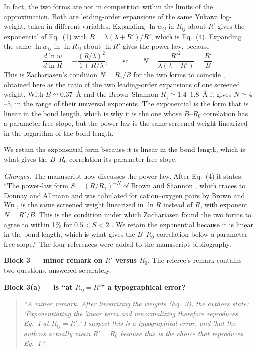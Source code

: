 \documentclass[11pt]{article}
\newenvironment{refquote}%
  {\begin{quote}\itshape\color{black!70}}%
  {\end{quote}}
\begin{document}
In fact, the two forms are not in competition within the limits of the approximation.  
Both are leading-order expansions of the same
Yukawa log-weight, taken in different variables.  Expanding
$\ln w_{ij}$ in $R_{ij}$ about $R'$ gives the exponential of
Eq.~(1) with $B=\lambda(\lambda+R')/R'$, which is Eq.~(4).
Expanding the same $\ln w_{ij}$ in $\ln R_{ij}$ about $\ln R'$ gives
the power law, because
\[
\frac{d\ln w}{d\ln R}
=-\frac{(R/\lambda)^2}{1+R/\lambda},
\qquad\text{so}\qquad
N=\frac{R'^2}{\lambda(\lambda+R')}=\frac{R'}{B}.
\]
This is Zachariasen's condition $N=R_1/B$ for the two forms to
coincide \cite{Zachariasen1978}, obtained here as the ratio of the
two leading-order expansions of one screened weight.  With
$B\simeq0.37$~\AA{} and the Brown--Shannon $R_1\simeq1.4$--$1.8$~\AA{}
it gives $N\simeq4$--$5$, in the range of their universal exponents.
The exponential is
the form that is linear in the bond length, which is why it is the
one whose $B$--$R_0$ correlation has a parameter-free slope, but the
power law is the same screened weight linearized in the logarithm of
the bond length.

We retain the exponential form because it is linear in the bond
length, which is what gives the $B$--$R_0$ correlation its
parameter-free slope.

\emph{Changes.}  The manuscript now discusses the power law.  After
Eq.~(4) it states: ``The power-law form $S=(R/R_1)^{-N}$ of Brown and
Shannon \cite{Brown1973}, which traces to Donnay and Allmann
\cite{Donnay1970} and was tabulated for cation--oxygen pairs by Brown
and Wu \cite{Brown1976}, is the same screened weight linearized in
$\ln R$ instead of $R$, with exponent $N=R'/B$.  This is the condition
under which Zachariasen found the two forms to agree to within 1\%
for $0.5<S<2$ \cite{Zachariasen1978}.  We retain the exponential
because it is linear in the bond length, which is what gives the
$B$--$R_0$ correlation below a parameter-free slope.''  The four
references were added to the manuscript bibliography.

\textbf{Block 3 --- minor remark on $R'$ versus $R_0$.}  The
referee's remark contains two questions, answered separately.

\textbf{Block 3(a) --- is ``at $R_{ij}=R'$'' a typographical error?}

\begin{refquote}
``A minor remark.  After linearizing the weights (Eq.~3), the authors
state: `Exponentiating the linear term and renormalizing therefore
reproduces Eq.~1 at $R_{ij}=R'$.'  I suspect this is a typographical
error, and that the authors actually mean $R'=R_0$ because this is
the choice that reproduces Eq.~1.''
\end{refquote}
\end{document}
